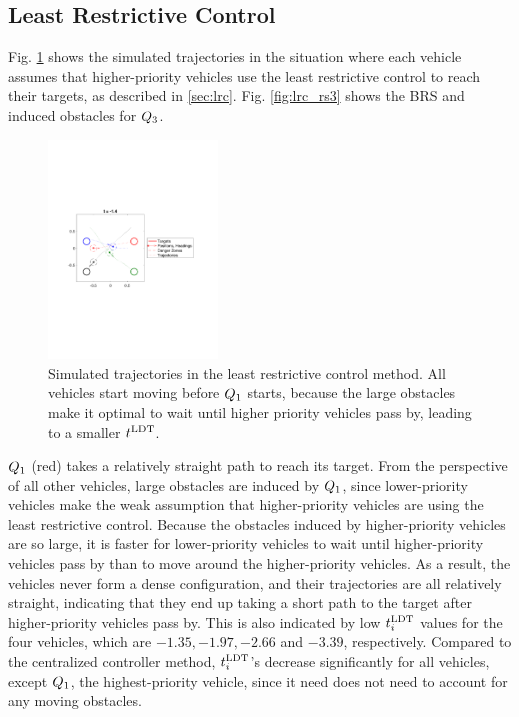 \subsection{Least Restrictive Control}
Fig. \ref{fig:lrc_traj} shows the simulated trajectories in the situation where each vehicle assumes that higher-priority vehicles use the least restrictive control to reach their targets, as described in \ref{sec:lrc}. Fig. \ref{fig:lrc_rs3} shows the BRS and induced obstacles for $Q_3$.

\begin{figure}
  \centering
  \includegraphics[width=0.40\textwidth]{"fig/lrc_traj"}
  \caption{Simulated trajectories in the least restrictive control method. All vehicles start moving before $Q_1$ starts, because the large obstacles make it optimal to wait until higher priority vehicles pass by, leading to a smaller $t^\text{LDT}$. }
  \label{fig:lrc_traj}
  \vspace{-2em}
\end{figure}

$Q_1$ (red) takes a relatively straight path to reach its target. From the perspective of all other vehicles, large obstacles are induced by $Q_1$, since lower-priority vehicles make the weak assumption that higher-priority vehicles are using the least restrictive control. Because the obstacles induced by higher-priority vehicles are so large, it is faster for lower-priority vehicles to wait until higher-priority vehicles pass by than to move around the higher-priority vehicles. As a result, the vehicles never form a dense configuration, and their trajectories are all relatively straight, indicating that they end up taking a short path to the target after higher-priority vehicles pass by. This is also indicated by low $t^\text{LDT}_i$ values for the four vehicles, which are $-1.35, -1.97, -2.66$ and $-3.39$, respectively. Compared to the centralized controller method, $t^\text{LDT}_i$'s decrease significantly for all vehicles, except $Q_1$, the highest-priority vehicle, since it need does not need to account for any moving obstacles. 


